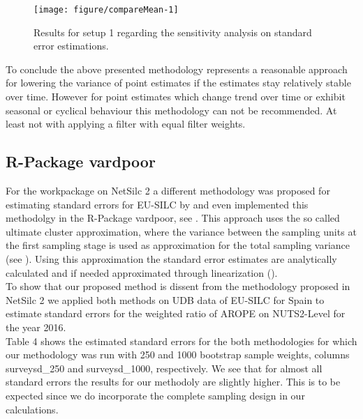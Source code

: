 \documentclass{scrartcl}
\begin{document}
\begin{knitrout}
\color{fgcolor}\begin{figure}
\texttt{[image: figure/compareMean-1]} \caption[Results for setup 1 regarding the sensitivity analysis on standard error estimations]{Results for setup 1 regarding the sensitivity analysis on standard error estimations.}\label{fig:compareMean}
\end{figure}


\end{knitrout}

To conclude the above presented methodology represents a reasonable approach for lowering the variance of point estimates if the estimates stay relatively stable over time. However for point estimates which change trend over time or exhibit seasonal or cyclical behaviour this methodology can not be recommended. At least not with applying a filter with equal filter weights.

\subsection{R-Package vardpoor}
For the workpackage on NetSilc 2 a different methodology was proposed for estimating standard errors for EU-SILC by \citep{soton416829} and even implemented this methodolgy in the R-Package vardpoor, see \citep{vardpoor}. This approach uses the so called ultimate cluster approximation, where the variance between the sampling units at the first sampling stage is used as approximation for the total sampling variance (see \citep{saerndal1992model}). Using this approximation the standard error estimates are analytically calculated and if needed approximated through linearization (\citep{devilleClaude}).\\
To show that our proposed method is dissent from the methodology proposed in NetSilc 2 we applied both methods on UDB data of EU-SILC for Spain to estimate standard errors for the weighted ratio of AROPE on NUTS2-Level for the year 2016.\\
Table 4 shows the estimated standard errors for the both methodologies for which our methodology was run with 250 and 1000 bootstrap sample weights, columns
surveysd_250 and surveysd_1000, respectively. We see that for almost all standard errors the results for our methodoly are slightly higher. This is to be expected since we do incorporate the complete sampling design in our calculations.
\end{document}
